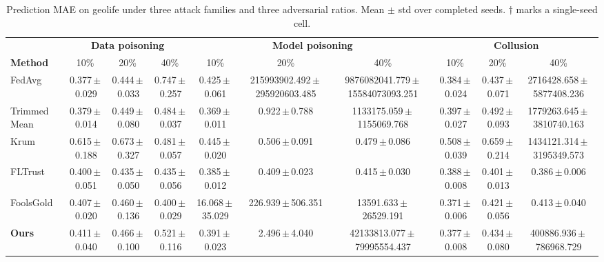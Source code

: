 \begin{table}[t]
\centering
\scriptsize
\caption{Prediction MAE on geolife under three attack families and three adversarial ratios. Mean $\pm$ std over completed seeds. $\dagger$ marks a single-seed cell.}
\label{tab:main_results}
\begin{tabular}{lccccccccc}
\toprule
& \multicolumn{3}{c}{\textbf{Data poisoning}}& \multicolumn{3}{c}{\textbf{Model poisoning}}& \multicolumn{3}{c}{\textbf{Collusion}} \\
\cmidrule(lr){2-4}\cmidrule(lr){5-7}\cmidrule(lr){8-10}
\textbf{Method} & 10\% & 20\% & 40\% & 10\% & 20\% & 40\% & 10\% & 20\% & 40\% \\
\midrule
FedAvg & 0.377\,$\pm$\,0.029 & 0.444\,$\pm$\,0.033 & 0.747\,$\pm$\,0.257 & 0.425\,$\pm$\,0.061 & 215993902.492\,$\pm$\,295920603.485 & 9876082041.779\,$\pm$\,15584073093.251 & 0.384\,$\pm$\,0.024 & 0.437\,$\pm$\,0.071 & 2716428.658\,$\pm$\,5877408.236 \\
Trimmed Mean & 0.379\,$\pm$\,0.014 & 0.449\,$\pm$\,0.080 & 0.484\,$\pm$\,0.037 & 0.369\,$\pm$\,0.011 & 0.922\,$\pm$\,0.788 & 1133175.059\,$\pm$\,1155069.768 & 0.397\,$\pm$\,0.027 & 0.492\,$\pm$\,0.093 & 1779263.645\,$\pm$\,3810740.163 \\
Krum & 0.615\,$\pm$\,0.188 & 0.673\,$\pm$\,0.327 & 0.481\,$\pm$\,0.057 & 0.445\,$\pm$\,0.020 & 0.506\,$\pm$\,0.091 & 0.479\,$\pm$\,0.086 & 0.508\,$\pm$\,0.039 & 0.659\,$\pm$\,0.214 & 1434121.314\,$\pm$\,3195349.573 \\
FLTrust & 0.400\,$\pm$\,0.051 & 0.435\,$\pm$\,0.050 & 0.435\,$\pm$\,0.056 & 0.385\,$\pm$\,0.012 & 0.409\,$\pm$\,0.023 & 0.415\,$\pm$\,0.030 & 0.388\,$\pm$\,0.008 & 0.401\,$\pm$\,0.013 & 0.386\,$\pm$\,0.006 \\
FoolsGold & 0.407\,$\pm$\,0.020 & 0.460\,$\pm$\,0.136 & 0.400\,$\pm$\,0.029 & 16.068\,$\pm$\,35.029 & 226.939\,$\pm$\,506.351 & 13591.633\,$\pm$\,26529.191 & 0.371\,$\pm$\,0.006 & 0.421\,$\pm$\,0.056 & 0.413\,$\pm$\,0.040 \\
\textbf{Ours} & 0.411\,$\pm$\,0.040 & 0.466\,$\pm$\,0.100 & 0.521\,$\pm$\,0.116 & 0.391\,$\pm$\,0.023 & 2.496\,$\pm$\,4.040 & 42133813.077\,$\pm$\,79995554.437 & 0.377\,$\pm$\,0.008 & 0.434\,$\pm$\,0.080 & 400886.936\,$\pm$\,786968.729 \\
\bottomrule
\end{tabular}
\end{table}

